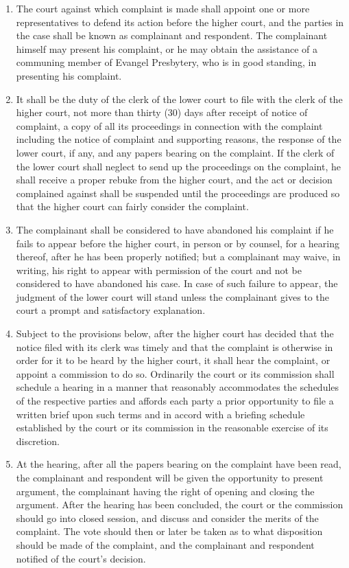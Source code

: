 \documentclass[
]{book}
\begin{document}
\begin{enumerate}
\item
  The court against which complaint is made shall appoint one or more representatives to defend its action before the higher court, and the parties in the case shall be known as complainant and respondent. The complainant himself may present his complaint, or he may obtain the assistance of a communing member of Evangel Presbytery, who is in good standing, in presenting his complaint.
\item
  It shall be the duty of the clerk of the lower court to file with the clerk of the higher court, not more than thirty (30) days after receipt of notice of complaint, a copy of all its proceedings in connection with the complaint including the notice of complaint and supporting reasons, the response of the lower court, if any, and any papers bearing on the complaint. If the clerk of the lower court shall neglect to send up the proceedings on the complaint, he shall receive a proper rebuke from the higher court, and the act or decision complained against shall be suspended until the proceedings are produced so that the higher court can fairly consider the complaint.
\item
  The complainant shall be considered to have abandoned his complaint if he fails to appear before the higher court, in person or by counsel, for a hearing thereof, after he has been properly notified; but a complainant may waive, in writing, his right to appear with permission of the court and not be considered to have abandoned his case. In case of such failure to appear, the judgment of the lower court will stand unless the complainant gives to the court a prompt and satisfactory explanation.
\item
  Subject to the provisions below, after the higher court has decided that the notice filed with its clerk was timely and that the complaint is otherwise in order for it to be heard by the higher court, it shall hear the complaint, or appoint a commission to do so. Ordinarily the court or its commission shall schedule a hearing in a manner that reasonably accommodates the schedules of the respective parties and affords each party a prior opportunity to file a written brief upon such terms and in accord with a briefing schedule established by the court or its commission in the reasonable exercise of its discretion.
\item
  At the hearing, after all the papers bearing on the complaint have been read, the complainant and respondent will be given the opportunity to present argument, the complainant having the right of opening and closing the argument. After the hearing has been concluded, the court or the commission should go into closed session, and discuss and consider the merits of the complaint. The vote should then or later be taken as to what disposition should be made of the complaint, and the complainant and respondent notified of the court's decision.

\end{enumerate}
\end{document}

